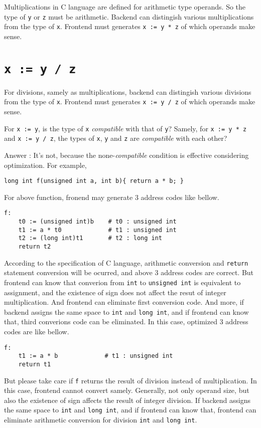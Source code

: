 Multiplications in C language are defined for arithmetic type operands.
So the type of {\tt{y}} or {\tt{z}} must be arithmetic.
Backend can distingish various multiplications from the type of {\tt{x}}.
Frontend must generates {\tt{x := y * z}} of which operands make sense.

\section{{\tt{x := y / z}}}

For divisions, samely as multiplications,
backend can distingish various divisions from the type of {\tt{x}}.
Frontend must generates {\tt{x := y / z}} of which operands make sense.

\begin{QandA}
For {\tt{x := y}}, is the type of {\tt{x}} {\it compatible}
with that of {\tt{y}}?  Samely, for 
{\tt{x := y * z}} and {\tt{x := y / z}},
the types of {\tt{x}}, {\tt{y}} and {\tt{z}} are
{\it compatible} with each other?

Answer : It's not, because the none-{\it compatible} condition
is effective considering optimization. For example,
\begin{verbatim}
long int f(unsigned int a, int b){ return a * b; }
\end{verbatim}
For above function, fronend may generate 3 address codes
like bellow.
\begin{verbatim}
f:
    t0 := (unsigned int)b    # t0 : unsigned int
    t1 := a * t0             # t1 : unsigned int
    t2 := (long int)t1       # t2 : long int
    return t2
\end{verbatim}
According to the specification of C language,
arithmetic conversion and {\tt{return}} statement conversion
will be ocurred, and above 3 address codes are correct.
But frontend can know that converion from {\tt{int}} to {\tt{unsigned int}}
is equivalent to assignment, and the existence of sign
does not affect the resut of integer multiplication.
And frontend can eliminate first conversion code.
And more, if backend assigns the same space
to {\tt {int}} and {\tt {long int}}, and if frontend can know
that, third converions code can be eliminated.
In this case, optimized 3 address codes are like bellow.
\begin{verbatim}
f:
    t1 := a * b             # t1 : unsigned int
    return t1
\end{verbatim}
But please take care if {\tt{f}} returns the result of division
instead of multiplication. In this case, frontend cannot convert
samely. Generally, not only operand size, but
also the existence of sign affects the result of integer
division. If backend assigns the same space
to {\tt {int}} and {\tt {long int}}, and if frontend can know
that, frontend can eliminate arithmetic conversion
for division {\tt {int}} and {\tt {long int}}.
\end{QandA}

